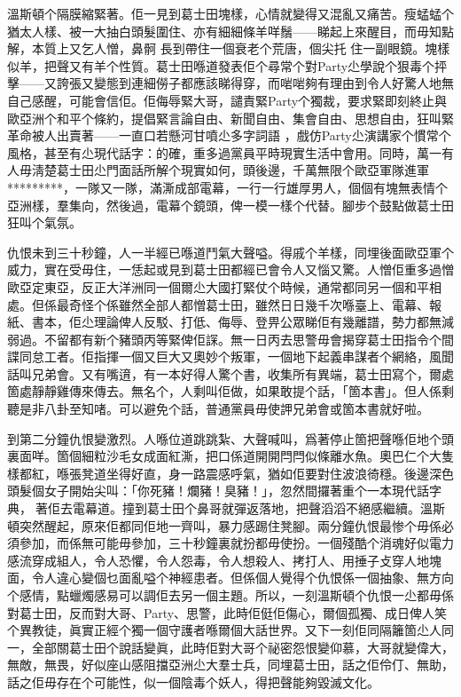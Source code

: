 溫斯頓个隔膜縮緊著。佢一見到葛士田塊樣，心情就變得又混亂又痛苦。瘦蜢蜢个猶太人樣、被一大抽白頭髮圍住、亦有細細條羊咩鬚——睇起上來醒目，而毋知點解，本質上又乞人憎，鼻䯊
長到帶住一個衰老个荒唐，個尖托%
住一副眼鏡。塊樣似羊，把聲又有羊个性質。葛士田喺道發表佢个尋常个對Party尐學說个狠毒个抨擊——又誇張又變態到連細僗子都應該睇得穿，而啱啱夠有理由到令人好驚人地無自己感醒，可能會信佢。佢侮辱緊大哥，譴責緊Party个獨裁，要求緊即刻終止與歐亞洲个和平个條約，提倡緊言論自由、新聞自由、集會自由、思想自由，狂叫緊革命被人出賣著——一直口若懸河甘噴尐多字詞語%
，戲仿Party尐演講家个慣常个風格，甚至有尐現代話字：的確，重多過黨員平時現實生活中會用。同時，萬一有人毋淸楚葛士田尐門面話所解个現實如何，頭後邊，千萬無限个歐亞軍隊進軍*********，一隊又一隊，滿澌成部電幕，一行一行雄厚男人，個個有塊無表情个亞洲樣，羣集向，然後過，電幕个鏡頭，俾一模一樣个代替。腳步个鼓點做葛士田狂叫个氣氛。

仇恨未到三十秒鐘，人一半經已喺道鬥氣大聲嗌。得戚个羊樣，同埋後面歐亞軍个威力，實在受毋住，一恁起或見到葛士田都經已會令人又惱又驚。人憎佢重多過憎歐亞定東亞，反正大洋洲同一個爾尐大國打緊仗个時候，通常都同另一個和平相處。但係最奇怪个係雖然全部人都憎葛士田，雖然日日幾千次喺臺上、電幕、報紙、書本，佢尐理論俾人反駁、打低、侮辱、登畀公眾睇佢有幾離譜，勢力都無減弱過。不留都有新个豬頭丙等緊俾佢𧨾。無一日丙去思警毋會揭穿葛士田指令个間諜同怠工者。佢指揮一個又巨大又奧妙个叛軍，一個地下起義串謀者个網絡，風聞話叫兄弟會。又有嘴逳，有一本好得人驚个書，收集所有異端，葛士田寫个，爾處箇處靜靜雞傳來傳去。無名个，人剩叫佢做，如果敢提个話，「箇本書」。但人係剩聽是非八卦至知啫。可以避免个話，普通黨員毋使䛅兄弟會或箇本書就好啦。

到第二分鐘仇恨變激烈。人喺位道跳跳紮、大聲喊叫，爲著停止箇把聲喺佢地个頭裏面咩。箇個細粒沙毛女成面紅澌，把口係道開開閂閂似條離水魚。奧巴仁个大隻樣都紅，喺張凳道坐得好直，身一路震感呼氣，猶如佢要對住波浪徛穩。後邊深色頭髮個女子開始尖叫：「你死豬！爛豬！臭豬！」，忽然間攞著重个一本現代話字典，𠌸著佢去電幕道。撞到葛士田个鼻哥就彈返落地，把聲滔滔不絕感繼續。溫斯頓突然醒起，原來佢都同佢地一齊叫，暴力感踢住凳腳。兩分鐘仇恨最惨个毋係必須參加，而係無可能毋參加，三十秒鐘裏就扮都毋使扮。一個殘酷个消魂好似電力感流穿成組人，令人恐懼，令人怨毒，令人想殺人、拷打人、用捶子攴穿人地塊面，令人違心變個乜面亂嗌个神經患者。但係個人覺得个仇恨係一個抽𧰼、無方向个感情，點蠟燭感易可以調佢去另一個主題。所以，一刻溫斯頓个仇恨一尐都毋係對葛士田，反而對大哥、Party、思警，此時佢侹佢傷心，爾個孤獨、成日俾人笑个異教徒，眞實正經个獨一個守護者喺爾個大話世界。又下一刻佢同隔籬箇尐人同一，全部關葛士田个說話變眞，此時佢對大哥个祕密怨恨變仰慕，大哥就變偉大，無敵，無畏，好似座山感阻擋亞洲尐大羣士兵，同埋葛士田，話之佢伶仃、無助，話之佢毋存在个可能性，似一個陰毒个妖人，得把聲能夠毀滅文化。

